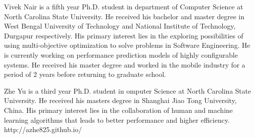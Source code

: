 \documentclass[10pt,journal,compsoc]{IEEEtran}
\begin{document}
\begin{IEEEbiography}
{Vivek Nair} is a fifth year Ph.D. student in department of Computer Science at North Carolina State University. He received his bachelor and master degree in West Bengal University of Technology and National Institute of Technology, Durgapur respectively. His primary interest lies in the exploring possibilities of using multi-objective optimization to solve problems in Software Engineering. He is currently working on performance prediction models of highly configurable systems. He received his master degree 
and worked in the mobile industry for a period of 2 years before returning to graduate school. 
\end{IEEEbiography}

\begin{IEEEbiography}
 {Zhe Yu} is a third year Ph.D. student in  omputer Science at North Carolina State University. He received his masters degree in Shanghai Jiao Tong University, China. His primary interest lies in the collaboration of human and machine learning algorithms that leads to better performance and higher efficiency. http://azhe825.github.io/
\end{IEEEbiography}
\end{document}
